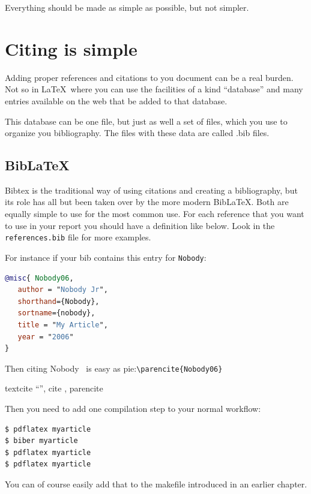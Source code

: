 \renewcommand\TheFile{ch08_citingsimple.tex}

\begin{savequote}[15cm]
  \raggedleft
\sffamily
Everything should be made as simple as possible, but not simpler.
\end{savequote}
\chapter{Citing is simple}

Adding proper references and citations to you document can be a real
burden.
Not so in \LaTeX\ where you can use the facilities of a kind ``database''
and many entries available on the web that be added to that database.

This database can be one file, but just as well a set of files, which
you use to organize you bibliography. The files with these data are
called .bib files. 

\section{Bib\LaTeX}
Bibtex is the traditional way of using citations and creating a bibliography, but its
role has all but been taken over by the more modern Bib\LaTeX.
Both are equally simple to use for the most common use. For each reference that you want to use in your report
you should have a definition like below. Look in the \texttt{references.bib} file for more examples.

For instance if your bib contains this entry for \texttt{Nobody}:
\begin{lstlisting}[language=BibTeX]
@misc{ Nobody06,
   author = "Nobody Jr",
   shorthand={Nobody},
   sortname={nobody},
   title = "My Article",
   year = "2006"
}
\end{lstlisting}
\lstset{language=BibTeX}
Then citing Nobody~\parencite{Nobody06} is easy as
pie:\lstinline|\parencite{Nobody06}|

textcite ``\textcite{Nobody06}'', cite \cite{Nobody06}, parencite \parencite{Nobody06}

Then you need to add one compilation step to your normal workflow:

\begin{lstlisting}[language=sh]
$ pdflatex myarticle
$ biber myarticle
$ pdflatex myarticle
$ pdflatex myarticle
\end{lstlisting}

You can of course easily add that to the makefile introduced in an
earlier chapter.

